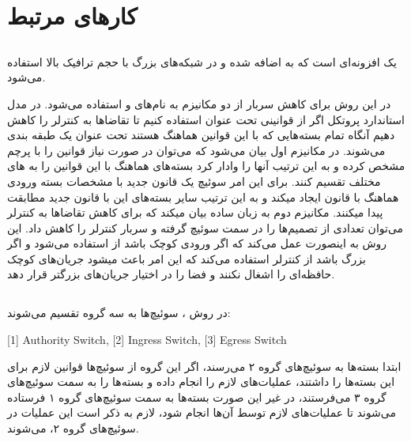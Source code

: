 ﻿\documentclass[11pt]{article}
\begin{document}
\section{کارهای مرتبط}
\subsection{}

\par
 یک افزونه‌ای است که به  اضافه شده و در شبکه‌های بزرگ با حجم ترافیک بالا استفاده می‌شود.
\par
در این روش برای کاهش سربار  از دو مکانیزم به نام‌های  و  استفاده می‌شود.
در مدل استاندارد پروتکل  اگر از قوانینی تحت عنوان  استفاده کنیم تا تقاضاها به کنترلر را کاهش دهیم آنگاه تمام بسته‌هایی که با این قوانین هماهنگ هستند تحت عنوان یک  طبقه بندی می‌شوند. در مکانیزم اول  بیان می‌شود که می‌توان در صورت نیاز قوانین  را با پرچم  مشخص کرده و به این ترتیب آنها را وادار کرد بسته‌های هماهنگ با این قوانین را به  های مختلف تقسیم کنند. برای این امر سوئیچ یک قانون جدید با مشخصات بسته ورودی هماهنگ با قانون  ایجاد میکند و به این ترتیب سایر بسته‌های این  با قانون جدید مطابقت پیدا میکنند. 
مکانیزم دوم به زبان ساده بیان میکند که برای کاهش تقاضاها به کنترلر می‌توان تعدادی از تصمیم‌ها را در سمت سوئیچ گرفته و سربار  کنترلر را کاهش داد. 
این روش به اینصورت عمل می‌کند که اگر  ورودی کوچک باشد از  استفاده می‌شود و اگر  بزرگ باشد از کنترلر استفاده می‌کند که این امر باعث میشود جریان‌های کوچک حافظه‌ای را اشغال نکنند و فضا را در اختیار جریان‌های بزرگتر قرار دهد.

\subsection{}

\par
در روش  ، سوئیچ‌ها به سه گروه تقسیم می‌شوند:
\begin{center}
\begin{latin}
[1] Authority Switch, [2] Ingress Switch, [3] Egress Switch
\end{latin}
\end{center}
\par
ابتدا بسته‌ها به سوئیچ‌های گروه ۲ می‌رسند، اگر این گروه از سوئیچ‌ها قوانین لازم برای این بسته‌ها را داشتند، عملیات‌های لازم را انجام داده و بسته‌ها را به سمت‌ سوئیچ‌های گروه ۳ می‌فرستند، در غیر این صورت بسته‌ها به سمت سوئیچ‌های گروه ۱ فرستاده می‌شوند تا عملیات‌های لازم توسط آن‌ها انجام شود، لازم به ذکر است این عملیات در سوئیچ‌های گروه ۲،  می‌شوند.
\end{document}

